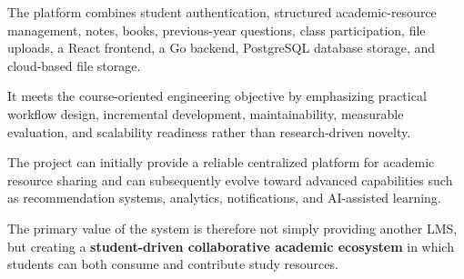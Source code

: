 \documentclass[11pt,a4paper]{article}
\begin{document}
The platform combines student authentication, structured academic-resource management, notes, books, previous-year questions, class participation, file uploads, a React frontend, a Go backend, PostgreSQL database storage, and cloud-based file storage.

It meets the course-oriented engineering objective by emphasizing practical workflow design, incremental development, maintainability, measurable evaluation, and scalability readiness rather than research-driven novelty.

The project can initially provide a reliable centralized platform for academic resource sharing and can subsequently evolve toward advanced capabilities such as recommendation systems, analytics, notifications, and AI-assisted learning.

The primary value of the system is therefore not simply providing another LMS, but creating a \textbf{student-driven collaborative academic ecosystem} in which students can both consume and contribute study resources.
\end{document}
